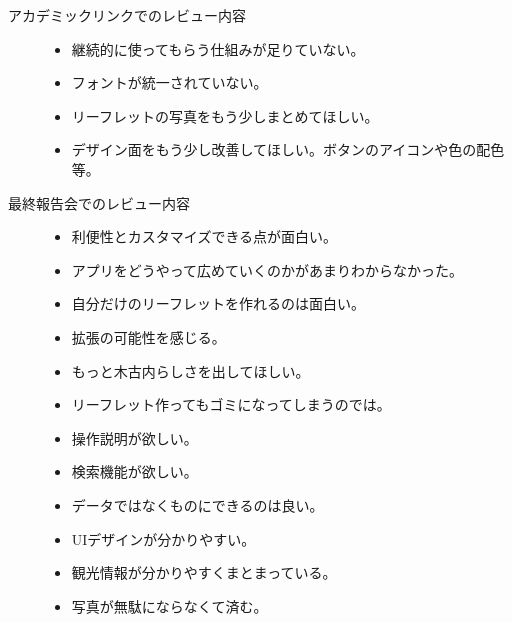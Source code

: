 \begin{description}
\item[アカデミックリンクでのレビュー内容]\mbox{}
 \begin{itemize}
 \item 継続的に使ってもらう仕組みが足りていない。
 \item フォントが統一されていない。
 \item リーフレットの写真をもう少しまとめてほしい。
 \item デザイン面をもう少し改善してほしい。ボタンのアイコンや色の配色等。
 \end{itemize}
\item[最終報告会でのレビュー内容]\mbox{}
 \begin{itemize}
 \item 利便性とカスタマイズできる点が面白い。
 \item アプリをどうやって広めていくのかがあまりわからなかった。
 \item 自分だけのリーフレットを作れるのは面白い。
 \item 拡張の可能性を感じる。
 \item もっと木古内らしさを出してほしい。
 \item リーフレット作ってもゴミになってしまうのでは。
 \item 操作説明が欲しい。
 \item 検索機能が欲しい。
 \item データではなくものにできるのは良い。
 \item UIデザインが分かりやすい。
 \item 観光情報が分かりやすくまとまっている。
 \item 写真が無駄にならなくて済む。
 \end{itemize}
\end{description}

